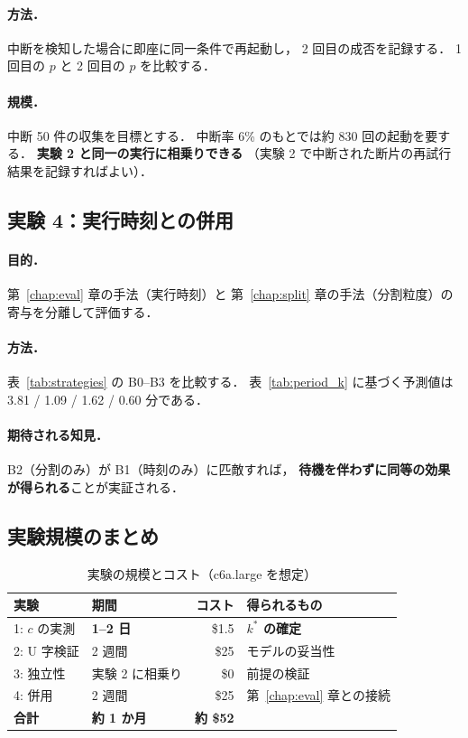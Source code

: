 \documentclass[11pt,a4paper]{ltjsreport}
\begin{document}
\paragraph{方法．}
中断を検知した場合に即座に同一条件で再起動し，
2 回目の成否を記録する．
1 回目の $p$ と 2 回目の $p$ を比較する．

\paragraph{規模．}
中断 50 件の収集を目標とする．
中断率 6\% のもとでは約 830 回の起動を要する．
\textbf{実験 2 と同一の実行に相乗りできる}
（実験 2 で中断された断片の再試行結果を記録すればよい）．

\subsection{実験 4：実行時刻との併用}

\paragraph{目的．}
第~\ref{chap:eval} 章の手法（実行時刻）と
第~\ref{chap:split} 章の手法（分割粒度）の
寄与を分離して評価する．

\paragraph{方法．}
表~\ref{tab:strategies} の B0--B3 を比較する．
表~\ref{tab:period_k} に基づく予測値は
3.81 / 1.09 / 1.62 / 0.60 分である．

\paragraph{期待される知見．}
B2（分割のみ）が B1（時刻のみ）に匹敵すれば，
\textbf{待機を伴わずに同等の効果が得られる}ことが実証される．

\subsection{実験規模のまとめ}

\begin{table}[htbp]
\centering
\caption{実験の規模とコスト（c6a.large を想定）}
\label{tab:exp_scale}
\small
\begin{tabularx}{\textwidth}{@{}llrX@{}}
\toprule
実験 & 期間 & コスト & 得られるもの \\
\midrule
1: $c$ の実測   & \textbf{1--2 日} & \$1.5 & \textbf{$k^{*}$ の確定} \\
2: U 字検証     & 2 週間 & \$25 & モデルの妥当性 \\
3: 独立性       & 実験 2 に相乗り & \$0 & 前提の検証 \\
4: 併用         & 2 週間 & \$25 & 第~\ref{chap:eval} 章との接続 \\
\midrule
\textbf{合計}   & \textbf{約 1 か月} & \textbf{約 \$52} & \\
\bottomrule
\end{tabularx}
\end{table}
\end{document}
